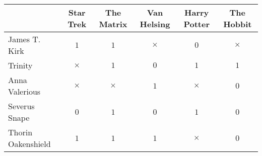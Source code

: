 \documentclass{standalone}
\begin{document}
  \sffamily
  \renewcommand{\arraystretch}{1.5}
  \begin{tabular}{lccccc}
    \hline
     & Star Trek & The Matrix & Van Helsing & Harry Potter & The Hobbit \\
    \hline
    \hline
    James T. Kirk & $1$ & $1$ & $\times$ & $0$ & $\times$\\
    Trinity & $\times$ & $1$ & $0$ & $1$ & $1$\\
    Anna Valerious & $\times$ & $\times$ & $1$ & $\times$ & $0$\\
    Severus Snape & $0$ & $1$ & $0$ & $1$ & $0$\\
    Thorin Oakenshield & $1$ & $1$ & $1$ & $\times$ & $0$\\
    \hline
  \end{tabular}
\end{document}

